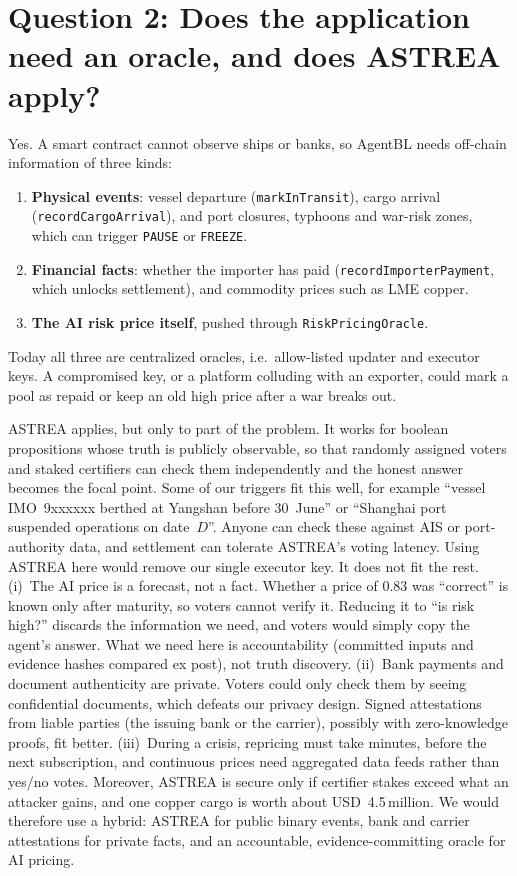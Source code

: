 \documentclass[11pt,a4paper]{article}
\newcommand{\code}[1]{\texttt{#1}}
\begin{document}
\section*{Question 2: Does the application need an oracle, and does ASTREA apply?}

Yes. A smart contract cannot observe ships or banks, so AgentBL needs off-chain
information of three kinds:
\begin{enumerate}
  \item \textbf{Physical events}: vessel departure (\code{markInTransit}),
        cargo arrival (\code{recordCargoArrival}), and port closures, typhoons
        and war-risk zones, which can trigger \code{PAUSE} or \code{FREEZE}.
  \item \textbf{Financial facts}: whether the importer has paid
        (\code{recordImporterPayment}, which unlocks settlement), and commodity
        prices such as LME copper.
  \item \textbf{The AI risk price itself}, pushed through
        \code{RiskPricingOracle}.
\end{enumerate}
Today all three are centralized oracles, i.e.\ allow-listed updater and
executor keys. A compromised key, or a platform colluding with an exporter,
could mark a pool as repaid or keep an old high price after a war breaks out.

ASTREA applies, but only to part of the problem. It works for boolean
propositions whose truth is publicly observable, so that randomly assigned
voters and staked certifiers can check them independently and the honest answer
becomes the focal point. Some of our triggers fit this well, for example
``vessel IMO~9xxxxxx berthed at Yangshan before 30~June'' or ``Shanghai port
suspended operations on date~$D$''. Anyone can check these against AIS or
port-authority data, and settlement can tolerate ASTREA's voting latency. Using
ASTREA here would remove our single executor key. It does not fit the rest.
(i)~The AI price is a forecast, not a fact. Whether a price of 0.83 was
``correct'' is known only after maturity, so voters cannot verify it. Reducing
it to ``is risk high?'' discards the information we need, and voters would
simply copy the agent's answer. What we need here is accountability (committed
inputs and evidence hashes compared ex post), not truth discovery.
(ii)~Bank payments and document authenticity are private. Voters could only
check them by seeing confidential documents, which defeats our privacy design.
Signed attestations from liable parties (the issuing bank or the carrier),
possibly with zero-knowledge proofs, fit better. (iii)~During a crisis,
repricing must take minutes, before the next subscription, and continuous
prices need aggregated data feeds rather than yes/no votes. Moreover, ASTREA is
secure only if certifier stakes exceed what an attacker gains, and one copper
cargo is worth about USD~4.5\,million. We would therefore use a hybrid: ASTREA
for public binary events, bank and carrier attestations for private facts, and
an accountable, evidence-committing oracle for AI pricing.
\end{document}
